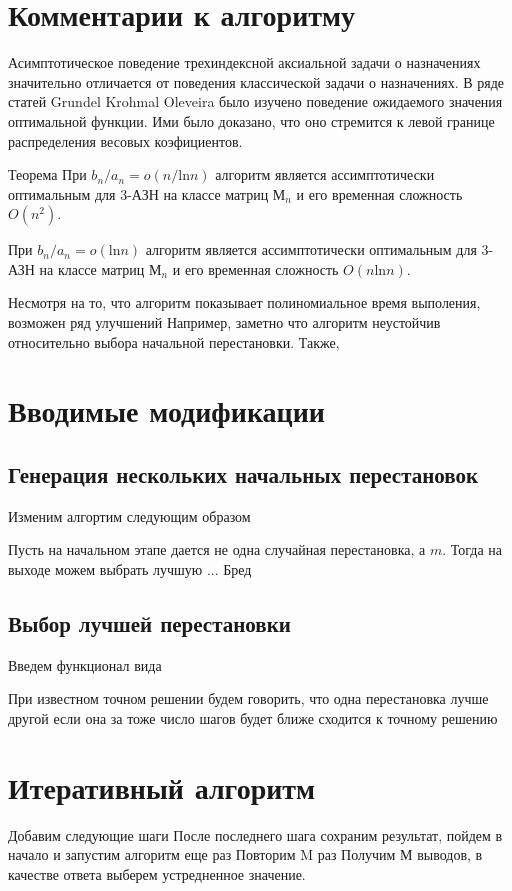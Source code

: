 \section{Комментарии к алгоритму}
Асимптотическое поведение трехиндексной аксиальной задачи о назначениях значительно отличается от поведения 
классической задачи о назначениях. В ряде статей Grundel Krohmal Oleveira было изучено поведение ожидаемого значения  оптимальной функции. Ими было доказано, что оно стремится к левой границе распределения весовых коэфициентов.

Теорема
При $b_n / a_n = o(n/ \mathrm{ln} n)$ алгоритм является ассимптотически оптимальным для 3-АЗН на классе матриц $М_n$
и его временная сложность  $O(n^2)$.

При $b_n / a_n = o(\mathrm{ln} n)$ алгоритм является ассимптотически оптимальным для 3-АЗН на классе матриц $М_n$
и его временная сложность  $O(n \mathrm{ln} n)$. 

Несмотря на то, что алгоритм показывает полиномиальное время выполения, возможен ряд улучшений
Например, заметно что алгоритм неустойчив относительно выбора начальной перестановки.
Также, 
\section{Вводимые модификации}
\subsection{Генерация нескольких начальных перестановок}
Изменим алгортим следующим образом

Пусть на начальном этапе дается не одна случайная перестановка, 
а $m$. Тогда на выходе можем выбрать лучшую ... Бред
\subsection{Выбор лучшей перестановки}
Введем функционал вида 

При известном точном решении будем говорить, что одна перестановка лучше другой
если она за тоже число шагов будет ближе сходится к точному решению 


\section{Итеративный алгоритм}
Добавим следующие шаги
После последнего шага сохраним результат, пойдем в начало и запустим алгоритм еще раз
Повторим M раз
Получим М выводов, в качестве ответа выберем устредненное значение. 